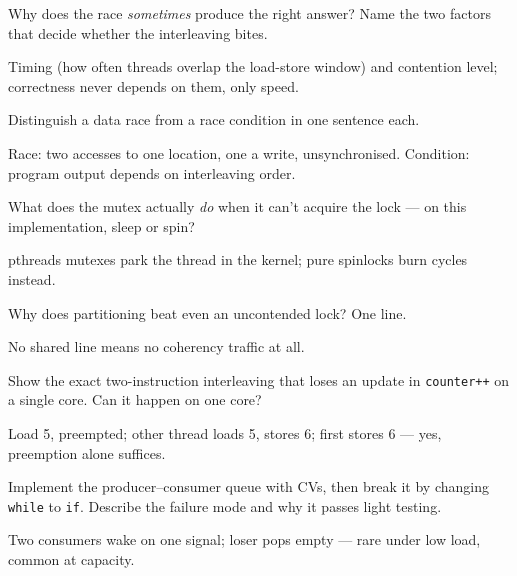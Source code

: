 \begin{exercise}[easy]
Why does the race \emph{sometimes} produce the right answer? Name
the two factors that decide whether the interleaving bites.
\end{exercise}
\begin{solution}[hint]
Timing (how often threads overlap the load-store window) and
contention level; correctness never depends on them, only speed.
\end{solution}

\begin{exercise}[easy]
Distinguish a data race from a race condition in one sentence each.
\end{exercise}
\begin{solution}[hint]
Race: two accesses to one location, one a write, unsynchronised.
Condition: program output depends on interleaving order.
\end{solution}

\begin{exercise}[easy]
What does the mutex actually \emph{do} when it can't acquire the
lock --- on this implementation, sleep or spin?
\end{exercise}
\begin{solution}[hint]
pthreads mutexes park the thread in the kernel; pure spinlocks
burn cycles instead.
\end{solution}

\begin{exercise}[easy]
Why does partitioning beat even an uncontended lock? One line.
\end{exercise}
\begin{solution}[hint]
No shared line means no coherency traffic at all.
\end{solution}

\begin{exercise}[medium]
Show the exact two-instruction interleaving that loses an update in
\texttt{counter++} on a single core. Can it happen on one core?
\end{exercise}
\begin{solution}[hint]
Load 5, preempted; other thread loads 5, stores 6; first stores 6
--- yes, preemption alone suffices.
\end{solution}

\begin{exercise}[medium]
Implement the producer--consumer queue with CVs, then break it by
changing \texttt{while} to \texttt{if}. Describe the failure mode
and why it passes light testing.
\end{exercise}
\begin{solution}[hint]
Two consumers wake on one signal; loser pops empty --- rare under
low load, common at capacity.
\end{solution}

